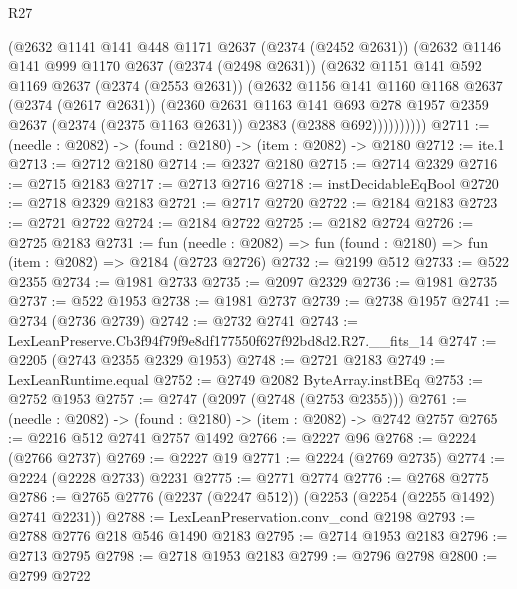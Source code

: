 \begin{lexlean}{R27}
\begin{coremodule}
            (@2632
              @1141
              @141
              @448
              @1171
              @2637
              (@2374 (@2452 @2631))
              (@2632
                @1146
                @141
                @999
                @1170
                @2637
                (@2374 (@2498 @2631))
                (@2632
                  @1151
                  @141
                  @592
                  @1169
                  @2637
                  (@2374 (@2553 @2631))
                  (@2632
                    @1156
                    @141
                    @1160
                    @1168
                    @2637
                    (@2374 (@2617 @2631))
                    (@2360
                      @2631
                      @1163
                      @141
                      @693
                      @278
                      @1957
                      @2359
                      @2637
                      (@2374 (@2375 @1163 @2631))
                      @2383
                      (@2388 @692))))))))))
@2711 := (needle : @2082) -> (found : @2180) -> (item : @2082) -> @2180
@2712 := ite.{1}
@2713 := @2712 @2180
@2714 := @2327 @2180
@2715 := @2714 @2329
@2716 := @2715 @2183
@2717 := @2713 @2716
@2718 := instDecidableEqBool
@2720 := @2718 @2329 @2183
@2721 := @2717 @2720
@2722 := @2184 @2183
@2723 := @2721 @2722
@2724 := @2184 @2722
@2725 := @2182 @2724
@2726 := @2725 @2183
@2731 := fun (needle : @2082) => fun (found : @2180) => fun (item : @2082) => @2184 (@2723 @2726)
@2732 := @2199 @512
@2733 := @522 @2355
@2734 := @1981 @2733
@2735 := @2097 @2329
@2736 := @1981 @2735
@2737 := @522 @1953
@2738 := @1981 @2737
@2739 := @2738 @1957
@2741 := @2734 (@2736 @2739)
@2742 := @2732 @2741
@2743 := LexLeanPreserve.Cb3f94f79f9e8df177550f627f92bd8d2.R27.__fits_14
@2747 := @2205 (@2743 @2355 @2329 @1953)
@2748 := @2721 @2183
@2749 := LexLeanRuntime.equal
@2752 := @2749 @2082 ByteArray.instBEq
@2753 := @2752 @1953
@2757 := @2747 (@2097 (@2748 (@2753 @2355)))
@2761 := (needle : @2082) -> (found : @2180) -> (item : @2082) -> @2742 @2757
@2765 := @2216 @512 @2741 @2757 @1492
@2766 := @2227 @96
@2768 := @2224 (@2766 @2737)
@2769 := @2227 @19
@2771 := @2224 (@2769 @2735)
@2774 := @2224 (@2228 @2733) @2231
@2775 := @2771 @2774
@2776 := @2768 @2775
@2786 := @2765 @2776 (@2237 (@2247 @512)) (@2253 (@2254 (@2255 @1492) @2741 @2231))
@2788 := LexLeanPreservation.conv_cond @2198
@2793 := @2788 @2776 @218 @546 @1490 @2183
@2795 := @2714 @1953 @2183
@2796 := @2713 @2795
@2798 := @2718 @1953 @2183
@2799 := @2796 @2798
@2800 := @2799 @2722

\end{coremodule}
\end{lexlean}
